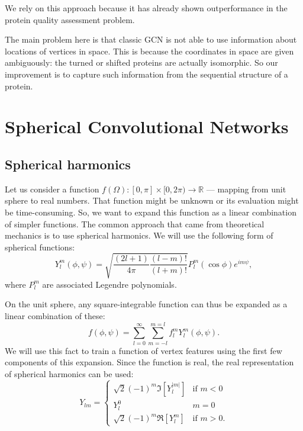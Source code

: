 \documentclass[12pt,twoside]{article}
\begin{document}
	We rely on this approach because it has already shown outperformance in the protein quality
	 assessment problem\cite{Baldassarre2020GRAPHQAPM}.
	
	The main problem here is that classic GCN is not able to use information about locations of vertices in space. This is because the coordinates in space
	are given ambiguously: the turned or shifted proteins are actually isomorphic. So our improvement is to capture such information from
	the sequential structure of a protein.

	\section{Spherical Convolutional Networks}
	\subsection{Spherical harmonics}
	Let us consider a function $f(\Omega) : [0, \pi] \times [0, 2\pi) \rightarrow \mathbb{R}$ — mapping from unit sphere to real
	numbers. That function might be unknown or its evaluation might be time-consuming. So, we want to expand this function as a linear
	combination of simpler functions. The common approach that came from theoretical mechanics is to use spherical harmonics\cite{Mueller1966}.
	We will use the following form of spherical functions:
	$$
		Y_l^m(\phi, \psi) = \sqrt{\dfrac{(2l + 1)}{4\pi}\dfrac{(l-m)!}{(l+m)!}}P_l^m(\cos \phi)e^{im\psi}, 
	$$
	where $P_l^{m}$ are associated Legendre polynomials\cite{Mueller1966}.

	On the unit sphere, any square-integrable function can thus be expanded as a linear combination of these:
	$$
	f(\phi, \psi) = \sum_{l = 0}^{\infty} \sum_{m=-l}^{m=l}f_l^m Y_l^m(\phi, \psi).
	$$
	We will use this fact to train a function of vertex features using the first few components of this expansion. 
	Since the function is real, the real representation of spherical harmonics can be used:
	$$
	Y_{lm} = \begin{cases}
		\sqrt{2}(-1)^m \Im\left[Y_l^{|m|}\right] & \text{if } m < 0 \\
		Y_l^0 & m = 0 \\
		\sqrt{2}(-1)^m \Re\left[Y_l^{m}\right] & \text{if } m > 0.
	\end{cases}
	$$
\end{document}
